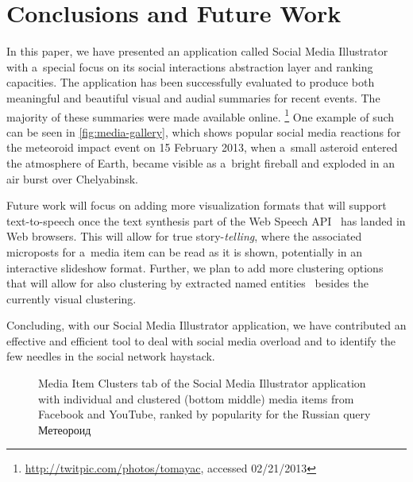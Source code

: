 \documentclass{sig-alt-release2}
\newcommand{\inlinelistingsize}{\fontsize{8pt}{11pt}}
\let\oldurl\url
\renewcommand{\url}[1]{\inlinelistingsize\oldurl{#1}}
\begin{document}
\section{Conclusions and Future Work}

In this paper, we have presented an application called Social Media Illustrator with
a~special focus on its social interactions abstraction layer and ranking capacities.
The application has been successfully evaluated to produce both meaningful and beautiful
visual and audial summaries for recent events.
The majority of these summaries were made available online.%
\footnote{\url{http://twitpic.com/photos/tomayac}, accessed 02/21/2013}
One example of such can be seen in \autoref{fig:media-gallery},
which shows popular social media reactions for the meteoroid impact event
on 15 February 2013, when a~small asteroid entered the atmosphere of Earth,
became visible as a~bright fireball
and exploded in an air burst over Chelyabinsk.

Future work will focus on adding more visualization formats that will support
text-to-speech once the text synthesis part
of the Web Speech API~\cite{shires2012webspeech} has landed in Web browsers.
This will allow for true story-\emph{telling}, where the associated microposts
for a~media item can be read as it is shown,
potentially in an interactive slideshow format.
Further, we plan to add more clustering options
that will allow for also clustering by extracted named entities~%
\cite{steiner2011addingmeaning} besides the currently visual clustering.

Concluding, with our Social Media Illustrator application, 
we have contributed an effective and efficient tool
to deal with social media overload
and to identify the few needles in the social network haystack. 

\begin{figure}[t!]
  \centering
  \setlength{\fboxsep}{1pt}
  \caption{Media Item Clusters tab of the Social Media Illustrator application
  with individual and clustered (bottom middle) media items from Facebook and YouTube,
  ranked by popularity for the Russian query
    \selectfont Метеороид \selectfont}
  \label{fig:application}
\end{figure}
\end{document}
